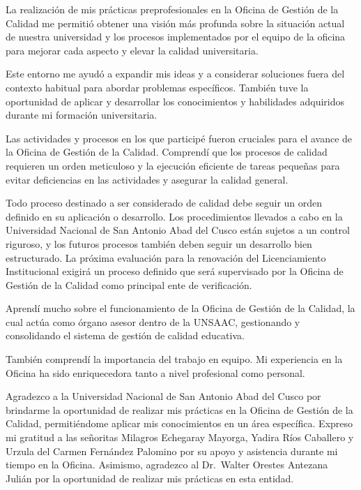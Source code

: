 \documentclass[
  12pt,
  letterpaper,
]{scrreprt}
\begin{document}
La realización de mis prácticas preprofesionales en la Oficina de
Gestión de la Calidad me permitió obtener una visión más profunda sobre
la situación actual de nuestra universidad y los procesos implementados
por el equipo de la oficina para mejorar cada aspecto y elevar la
calidad universitaria.

Este entorno me ayudó a expandir mis ideas y a considerar soluciones
fuera del contexto habitual para abordar problemas específicos. También
tuve la oportunidad de aplicar y desarrollar los conocimientos y
habilidades adquiridos durante mi formación universitaria.

Las actividades y procesos en los que participé fueron cruciales para el
avance de la Oficina de Gestión de la Calidad. Comprendí que los
procesos de calidad requieren un orden meticuloso y la ejecución
eficiente de tareas pequeñas para evitar deficiencias en las actividades
y asegurar la calidad general.

Todo proceso destinado a ser considerado de calidad debe seguir un orden
definido en su aplicación o desarrollo. Los procedimientos llevados a
cabo en la Universidad Nacional de San Antonio Abad del Cusco están
sujetos a un control riguroso, y los futuros procesos también deben
seguir un desarrollo bien estructurado. La próxima evaluación para la
renovación del Licenciamiento Institucional exigirá un proceso definido
que será supervisado por la Oficina de Gestión de la Calidad como
principal ente de verificación.

Aprendí mucho sobre el funcionamiento de la Oficina de Gestión de la
Calidad, la cual actúa como órgano asesor dentro de la UNSAAC,
gestionando y consolidando el sistema de gestión de calidad educativa.

También comprendí la importancia del trabajo en equipo. Mi experiencia
en la Oficina ha sido enriquecedora tanto a nivel profesional como
personal.

Agradezco a la Universidad Nacional de San Antonio Abad del Cusco por
brindarme la oportunidad de realizar mis prácticas en la Oficina de
Gestión de la Calidad, permitiéndome aplicar mis conocimientos en un
área específica. Expreso mi gratitud a las señoritas Milagros Echegaray
Mayorga, Yadira Ríos Caballero y Urzula del Carmen Fernández Palomino
por su apoyo y asistencia durante mi tiempo en la Oficina. Asimismo,
agradezco al Dr.~Walter Orestes Antezana Julián por la oportunidad de
realizar mis prácticas en esta entidad.

\end{document}
